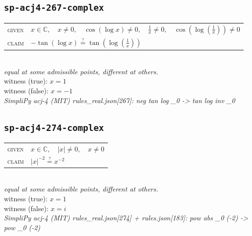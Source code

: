 \documentclass[11pt]{article}
\begin{document}
\subsection*{\texttt{sp-acj4-267-complex}}
\begin{tabular}{@{}l@{\quad}l@{}}
\textsc{given} & $x \in \mathbb{C},\quad x \neq 0,\quad \cos\left(\log x\right) \neq 0,\quad \frac{1}{x} \neq 0,\quad \cos\left(\log\left(\frac{1}{x}\right)\right) \neq 0$ \\[4pt]
\textsc{claim} & $\displaystyle -\tan\left(\log x\right) \overset{?}{=} \tan\left(\log\left(\frac{1}{x}\right)\right)$ \\
\end{tabular}\\[2pt]
{\small\emph{equal at some admissible points, different at others.}}\\
{\footnotesize\color{gray}witness (true): $x = 1$}\\
{\footnotesize\color{gray}witness (false): $x = -1$}\\
\emph{SimpliPy acj-4 (MIT) rules\_real.json[267]: neg tan log \_0  ->  tan log inv \_0}\\

\subsection*{\texttt{sp-acj4-274-complex}}
\begin{tabular}{@{}l@{\quad}l@{}}
\textsc{given} & $x \in \mathbb{C},\quad \left|x\right| \neq 0,\quad x \neq 0$ \\[4pt]
\textsc{claim} & $\displaystyle \left|x\right|^{-2} \overset{?}{=} x^{-2}$ \\
\end{tabular}\\[2pt]
{\small\emph{equal at some admissible points, different at others.}}\\
{\footnotesize\color{gray}witness (true): $x = 1$}\\
{\footnotesize\color{gray}witness (false): $x = i$}\\
\emph{SimpliPy acj-4 (MIT) rules\_real.json[274] + rules.json[183]: pow abs \_0 (-2)  ->  pow \_0 (-2)}\\
\end{document}
